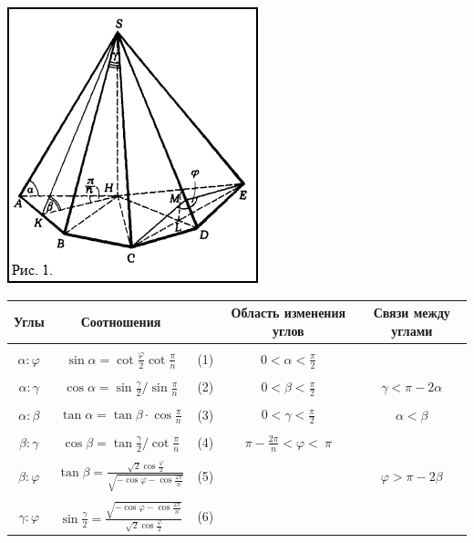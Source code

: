 \documentclass[a4paper,twoside]{article}
\begin{document}
\begin{spacing}{1.1}
\begin{large}
\begin{multicols*}{2}
\leftskip=0cm
\vspace*{0.5cm}
\noindent\includegraphics{fig1}
\end{multicols*}
\end{large}
\end{spacing}

\hspace*{-5ex}
\begin{tabular}{ c | c r| c | c }
\hline
Углы & \hspace*{0.7cm} Соотношения&& Область изменения углов & Связи между углами\\
\hline
&&&\\
$\alpha: \varphi$ & $\displaystyle \sin \alpha = \cot \frac{\varphi}{2} \cot \frac{\pi}{n}$ & (1)& $\displaystyle 0 < \alpha < \frac{\pi}{2}$ & \\
&&&\\
$\alpha: \gamma$ & $\displaystyle \cos \alpha = \sin \frac{\gamma}{2}/\sin \frac{\pi}{n}$ & (2)& $\displaystyle 0 < \beta < \frac{\pi}{2}$ & $\displaystyle \gamma < \pi - 2\alpha$ \\
&&&\\
$\alpha: \beta$ & $\displaystyle \tan \alpha = \tan \beta \cdot \cos \frac{\pi}{n}$ & (3)& $\displaystyle 0 < \gamma < \frac{\pi}{2}$ & $\displaystyle \alpha< \beta$ \\
&&&\\
$\beta: \gamma$ & $\displaystyle \cos \beta = \tan \frac{\gamma}{2}/\cot\frac{\pi}{n}$ & (4)& $\displaystyle \pi - \frac{2\pi}{n} < \varphi < \ \pi$ & \\
&&&\\
$\beta: \varphi$ & $\displaystyle \tan \beta = \frac {\sqrt{2} \cos \frac{\varphi}{2} } {\sqrt{-\cos \varphi - \cos \frac{2\pi}{n} } }$ & (5)& & $\displaystyle \varphi > \pi - 2\beta$ \\
&&&\\
$\gamma: \varphi$ & $\displaystyle \sin \frac{\gamma}{2} = \frac {\sqrt{-\cos \varphi - \cos \frac{2\pi}{n}}} {\sqrt{2} \cos \frac{\varphi}{2}}$ & (6)& & \\
\end{tabular}
\end{document}
